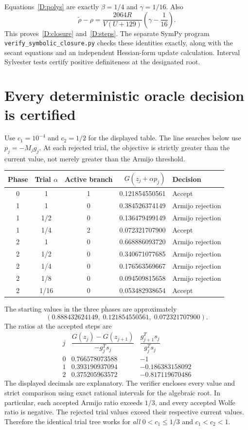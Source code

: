 Equations~\eqref{D:polys} are exactly $\beta=1/4$ and $\gamma=1/16$. Also
\[
 \widetilde\rho-\rho
 =\frac{2064R}{V(U+129)}\left(\gamma-\frac1{16}\right).
\]
This proves~\eqref{D:closure} and~\eqref{D:steps}. The separate SymPy program \texttt{verify\_symbolic\_closure.py} checks these identities exactly, along with the secant equations and an independent Hessian-form update calculation. Interval Sylvester tests certify positive definiteness at the designated root.


\setcounter{section}{2}
\setcounter{theorem}{1}
\setcounter{lemma}{1}
\setcounter{corollary}{0}
\setcounter{proposition}{0}
\setcounter{remark}{0}
\setcounter{equation}{6}
\section{Every deterministic oracle decision is certified}
Use $c_1=10^{-4}$ and $c_2=1/2$ for the displayed table. The line searches below use $p_j=-M_jg_j$. At each rejected trial, the objective is strictly greater than the current value, not merely greater than the Armijo threshold.
\begin{center}\small
\begin{tabular}{cccrl}\toprule
Phase & Trial $\alpha$ & Active branch & $G(z_j+\alpha p_j)$ & Decision\\\midrule
0&1&1&0.121854550561&Accept\\\midrule
1&1&0&0.384526374149&Armijo rejection\\
1&1/2&0&0.136479499149&Armijo rejection\\
1&1/4&2&0.072321707900&Accept\\\midrule
2&1&0&0.668886093720&Armijo rejection\\
2&1/2&0&0.340671077685&Armijo rejection\\
2&1/4&0&0.176563569667&Armijo rejection\\
2&1/8&0&0.094509815658&Armijo rejection\\
2&1/16&0&0.053482938654&Accept\\\bottomrule
\end{tabular}
\end{center}
The starting values in the three phases are approximately
\[
 (0.888432624149,\;0.121854550561,\;0.072321707900).
\]
The ratios at the accepted steps are
\[
\begin{array}{c|rr}
 j & \dfrac{G(z_j)-G(z_{j+1})}{-g_j^Ts_j}
 &\dfrac{g_{j+1}^Ts_j}{g_j^Ts_j}\\\hline
0&0.766578073588&-1\\
1&0.393190937094&-0.186383158092\\
2&0.375205963572&-0.817119670486
\end{array}
\]
The displayed decimals are explanatory. The verifier encloses every value and strict comparison using exact rational intervals for the algebraic root. In particular, each accepted Armijo ratio exceeds $1/3$, and every accepted Wolfe ratio is negative. The rejected trial values exceed their respective current values. Therefore the identical trial tree works for \emph{all} $0<c_1\le1/3$ and $c_1<c_2<1$.

